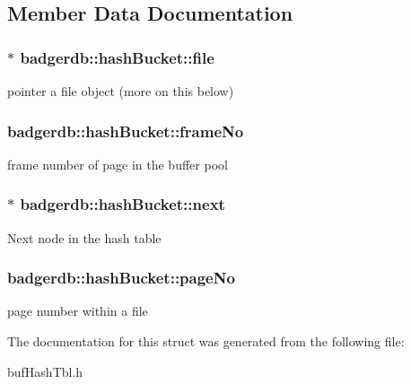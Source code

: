 \subsection{Member Data Documentation}
\hypertarget{structbadgerdb_1_1hashBucket_a756f18d35180fe074060633a76e9d27f}{
\subsubsection[{file}]{$\ast$ badgerdb\-::hash\-Bucket\-::file}}\label{structbadgerdb_1_1hashBucket_a756f18d35180fe074060633a76e9d27f}
pointer a file object (more on this below) \hypertarget{structbadgerdb_1_1hashBucket_ab1b34471afe07b208150c805ac83b0b6}{
\subsubsection[{frame\-No}]{ badgerdb\-::hash\-Bucket\-::frame\-No}}\label{structbadgerdb_1_1hashBucket_ab1b34471afe07b208150c805ac83b0b6}
frame number of page in the buffer pool \hypertarget{structbadgerdb_1_1hashBucket_aca2ab1451a26b84317cb28f99793d43c}{
\subsubsection[{next}]{$\ast$ badgerdb\-::hash\-Bucket\-::next}}\label{structbadgerdb_1_1hashBucket_aca2ab1451a26b84317cb28f99793d43c}
Next node in the hash table \hypertarget{structbadgerdb_1_1hashBucket_af81c5ca74d02362df3fab9bd4c471da5}{
\subsubsection[{page\-No}]{ badgerdb\-::hash\-Bucket\-::page\-No}}\label{structbadgerdb_1_1hashBucket_af81c5ca74d02362df3fab9bd4c471da5}
page number within a file 

The documentation for this struct was generated from the following file\-:\begin{DoxyCompactItemize}
\item 
buf\-Hash\-Tbl.\-h\end{DoxyCompactItemize}
